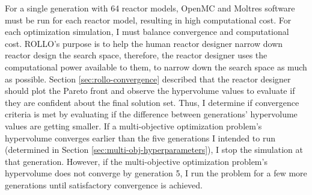 For a single generation with 64 reactor models, OpenMC and Moltres software must be 
run for each reactor model, resulting in high computational cost. 
For each optimization simulation, I must balance convergence and computational cost.
\gls{ROLLO}'s purpose is to help the human reactor designer narrow down reactor design 
the search space, therefore, the reactor designer uses the computational 
power available to them, to narrow down the search space as much as possible. 
Section \ref{sec:rollo-convergence} described that the reactor designer should 
plot the Pareto front and observe the hypervolume values to evaluate if they are 
confident about the final solution set.  
Thus, I determine if convergence criteria is met by evaluating if the difference 
between generations' hypervolume values are getting smaller. 
If a multi-objective optimization problem's hypervolume converges earlier than the 
five generations I intended to run (determined in Section 
\ref{sec:multi-obj-hyperparameters}), I stop the simulation at that generation. 
However, if the multi-objective optimization problem's hypervolume does not converge by 
generation 5, I run the problem for a few more generations until satisfactory 
convergence is achieved.

